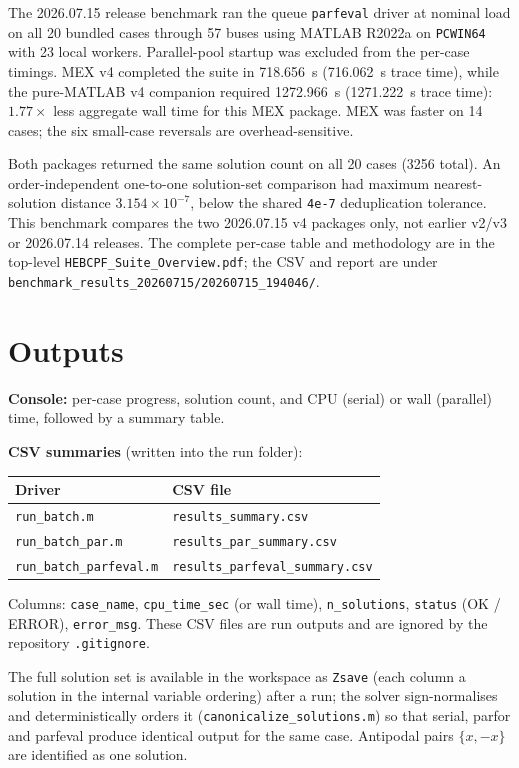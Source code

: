 \documentclass[11pt,a4paper]{article}
\newcommand{\code}[1]{\texttt{#1}}
\begin{document}
The 2026.07.15 release benchmark ran the queue \code{parfeval} driver at nominal load on
all 20 bundled cases through 57 buses using MATLAB R2022a on \code{PCWIN64} with 23 local
workers. Parallel-pool startup was excluded from the per-case timings. MEX v4 completed the
suite in 718.656~s (716.062~s trace time), while the pure-MATLAB v4 companion required
1272.966~s (1271.222~s trace time): $1.77\times$ less aggregate wall time for this MEX
package. MEX was faster on 14 cases; the six small-case reversals are overhead-sensitive.

Both packages returned the same solution count on all 20 cases (3256 total). An
order-independent one-to-one solution-set comparison had maximum nearest-solution distance
$3.154\times10^{-7}$, below the shared \code{4e-7} deduplication tolerance. This benchmark
compares the two 2026.07.15 v4 packages only, not earlier v2/v3 or 2026.07.14 releases.
The complete per-case table and methodology are in the top-level
\code{HEBCPF_Suite_Overview.pdf}; the CSV and report are under
\code{benchmark_results_20260715/20260715_194046/}.

\section{Outputs}

\textbf{Console:} per-case progress, solution count, and CPU (serial) or wall (parallel)
time, followed by a summary table.

\textbf{CSV summaries} (written into the run folder):
\begin{center}\small
\begin{tabular}{@{}ll@{}}
\toprule
Driver & CSV file\\
\midrule
\code{run_batch.m}          & \code{results_summary.csv}\\
\code{run_batch_par.m}      & \code{results_par_summary.csv}\\
\code{run_batch_parfeval.m} & \code{results_parfeval_summary.csv}\\
\bottomrule
\end{tabular}
\end{center}
Columns: \code{case_name}, \code{cpu_time_sec} (or wall time), \code{n_solutions},
\code{status} (OK / ERROR), \code{error_msg}.
These CSV files are run outputs and are ignored by the repository \code{.gitignore}.

The full solution set is available in the workspace as \code{Zsave} (each column a
solution in the internal variable ordering) after a run; the solver sign-normalises and
deterministically orders it (\code{canonicalize_solutions.m}) so that serial, parfor and
parfeval produce identical output for the same case. Antipodal pairs $\{x,-x\}$ are
identified as one solution.
\end{document}
